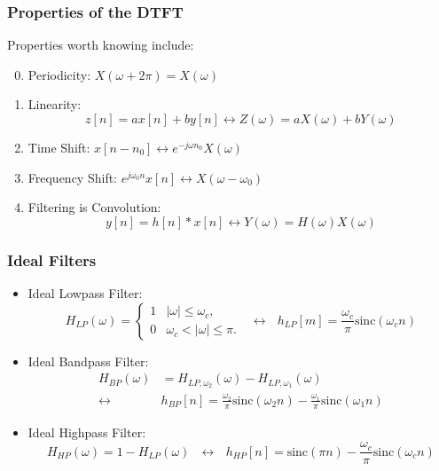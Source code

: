 \documentclass{beamer}
\begin{document}
\begin{frame}
  \frametitle{Properties of the DTFT}

  Properties worth knowing  include:
  \begin{enumerate}
    \setcounter{enumi}{-1}
  \item Periodicity: $X(\omega+2\pi)=X(\omega)$
  \item Linearity:
    \[z[n]=ax[n]+by[n]\leftrightarrow Z(\omega)=aX(\omega)+bY(\omega)
    \]
  \item Time Shift: $x[n-n_0]\leftrightarrow e^{-j\omega n_0}X(\omega)$
  \item Frequency Shift: $e^{j\omega_0 n}x[n]\leftrightarrow X(\omega-\omega_0)$
  \item Filtering is Convolution:
    \[
    y[n]=h[n]\ast x[n]\leftrightarrow Y(\omega)=H(\omega)X(\omega)
    \]
  \end{enumerate}
\end{frame}

\begin{frame}
  \frametitle{Ideal Filters}
  \begin{itemize}
  \item Ideal Lowpass Filter:
    \[
    H_{LP}(\omega)
    = \begin{cases} 1& |\omega|\le\omega_c,\\
      0 & \omega_c<|\omega|\le\pi.
    \end{cases}~~~\leftrightarrow~~~
    h_{LP}[m]=\frac{\omega_c}{\pi}\mbox{sinc}(\omega_c n)
    \]
  \item Ideal Bandpass Filter:
    \begin{align*}
      H_{BP}(\omega)&=H_{LP,\omega_2}(\omega)-H_{LP,\omega_1}(\omega)\\
      \leftrightarrow
      &h_{BP}[n]=\frac{\omega_2}{\pi}\mbox{sinc}(\omega_2 n)-\frac{\omega_1}{\pi}\mbox{sinc}(\omega_1 n)
    \end{align*}
  \item Ideal Highpass Filter:
    \[
    H_{HP}(\omega)=1-H_{LP}(\omega)~~~\leftrightarrow~~~
    h_{HP}[n]=\mbox{sinc}(\pi n)-\frac{\omega_c}{\pi}\mbox{sinc}(\omega_c n)
    \]
  \end{itemize}
\end{frame}
\end{document}
